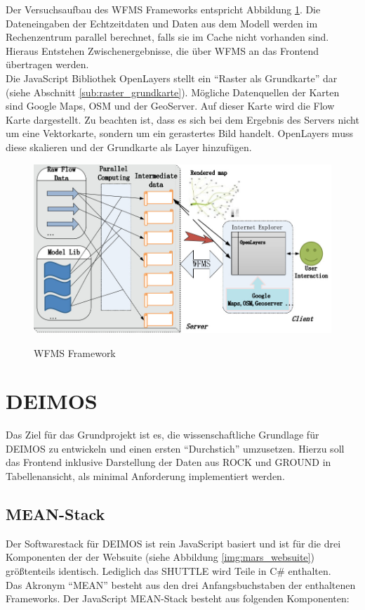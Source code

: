 \documentclass[10pt,conference,compsocconf]{IEEEtran}
\begin{document}
Der Versuchsaufbau des WFMS Frameworks entspricht Abbildung \ref{img:wfms}. Die Dateneingaben der Echtzeitdaten und Daten aus dem Modell werden im Rechenzentrum parallel berechnet, falls sie im Cache nicht vorhanden sind. Hieraus Entstehen Zwischenergebnisse, die über WFMS an das Frontend übertragen werden.\\
Die JavaScript Bibliothek OpenLayers stellt ein \enquote{Raster als Grundkarte} dar (siehe Abschnitt \ref{sub:raster_grundkarte}). Mögliche Datenquellen der Karten sind Google Maps, OSM und der GeoServer. Auf dieser Karte wird die Flow Karte dargestellt. Zu beachten ist, dass es sich bei dem Ergebnis des Servers nicht um eine Vektorkarte, sondern um ein gerastertes Bild handelt. OpenLayers muss diese skalieren und der Grundkarte als Layer hinzufügen.

\begin{figure}[H]
  \centering
  	\includegraphics[width=\columnwidth]{img/wfms}\\
  \caption[]{WFMS Framework\cite{wms_flow_mapping}}
  \label{img:wfms}
\end{figure}

\section{DEIMOS}
Das Ziel für das Grundprojekt ist es, die wissenschaftliche Grundlage für DEIMOS zu entwickeln und einen ersten \enquote{Durchstich} umzusetzen. Hierzu soll das Frontend inklusive Darstellung der Daten aus ROCK und GROUND in Tabellenansicht, als minimal Anforderung implementiert werden.\\

\subsection{MEAN-Stack}
Der Softwarestack für DEIMOS ist rein JavaScript basiert und ist für die drei Komponenten der der Websuite (siehe Abbildung \ref{img:mars_websuite}) größtenteils identisch. Lediglich das SHUTTLE wird Teile in C\# enthalten. \\
Das Akronym \enquote{MEAN} besteht aus den drei Anfangsbuchstaben der enthaltenen Frameworks. Der JavaScript MEAN-Stack besteht aus folgenden Komponenten:
\end{document}
